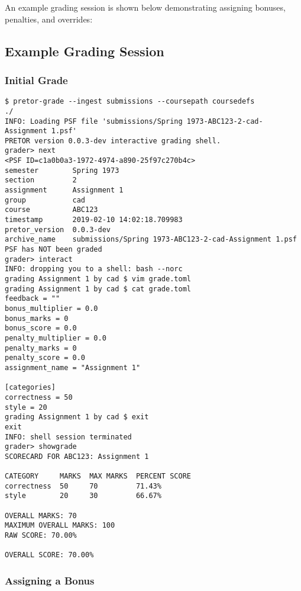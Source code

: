 \documentclass{book}
\begin{document}

An example grading session is shown below demonstrating assigning bonuses,
penalties, and overrides:

\subsection{Example Grading Session}

\subsubsection{Initial Grade}

\begin{verbatim}
$ pretor-grade --ingest submissions --coursepath coursedefs
./
INFO: Loading PSF file 'submissions/Spring 1973-ABC123-2-cad-Assignment 1.psf'
PRETOR version 0.0.3-dev interactive grading shell.
grader> next
<PSF ID=c1a0b0a3-1972-4974-a890-25f97c270b4c>
semester        Spring 1973
section         2
assignment      Assignment 1
group           cad
course          ABC123
timestamp       2019-02-10 14:02:18.709983
pretor_version  0.0.3-dev
archive_name    submissions/Spring 1973-ABC123-2-cad-Assignment 1.psf
PSF has NOT been graded
grader> interact
INFO: dropping you to a shell: bash --norc
grading Assignment 1 by cad $ vim grade.toml
grading Assignment 1 by cad $ cat grade.toml
feedback = ""
bonus_multiplier = 0.0
bonus_marks = 0
bonus_score = 0.0
penalty_multiplier = 0.0
penalty_marks = 0
penalty_score = 0.0
assignment_name = "Assignment 1"

[categories]
correctness = 50
style = 20
grading Assignment 1 by cad $ exit
exit
INFO: shell session terminated
grader> showgrade
SCORECARD FOR ABC123: Assignment 1

CATEGORY     MARKS  MAX MARKS  PERCENT SCORE
correctness  50     70         71.43%
style        20     30         66.67%

OVERALL MARKS: 70
MAXIMUM OVERALL MARKS: 100
RAW SCORE: 70.00%

OVERALL SCORE: 70.00%
\end{verbatim}

\subsubsection{Assigning a Bonus}
\end{document}
